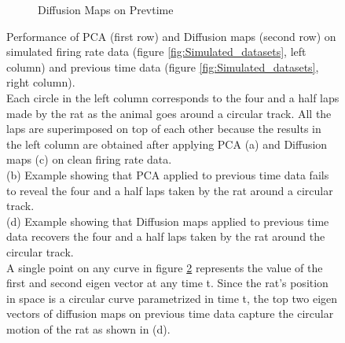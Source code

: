 \begin{figure}[H]
\begin{subfigure}[b]{0.475\textwidth}
            \caption[]%
            {{\small Diffusion Maps on Prevtime}}  
            \label{fig:Diffusion maps on Prevtime in 3D }
        \end{subfigure}
        \caption[]%
         {\small Performance of PCA (first row) and Diffusion maps (second row) on simulated firing rate data (figure \ref{fig:Simulated_datasets}, left column)  and  previous  time data (figure \ref{fig:Simulated_datasets}, right column).\\
         Each circle in the left column corresponds to the four and a half laps made by the rat as the animal goes around 
         a circular track.  All the laps are superimposed on top of each other because the results in the left column
         are obtained after applying PCA (a) and Diffusion maps (c) on clean firing rate data.\\
         (b) Example showing that PCA applied to previous time data fails to reveal the four and a half laps taken by the rat around a circular track.\\
          (d)  Example showing that  Diffusion maps applied to previous time data recovers the four and a half laps taken by the rat around the circular  track. \\  
         A single point on any curve in figure \ref{fig:DiffMaps_PCA_on_Prevtime_FR} represents the value of the first and 
         second eigen vector at any time t. Since the rat's position in space is a circular curve parametrized in time t, the top
         two eigen vectors of diffusion maps on previous time data capture the circular motion of the rat as shown in (d).} 
        \label{fig:DiffMaps_PCA_on_Prevtime_FR}
\end{figure}


\newpage



















